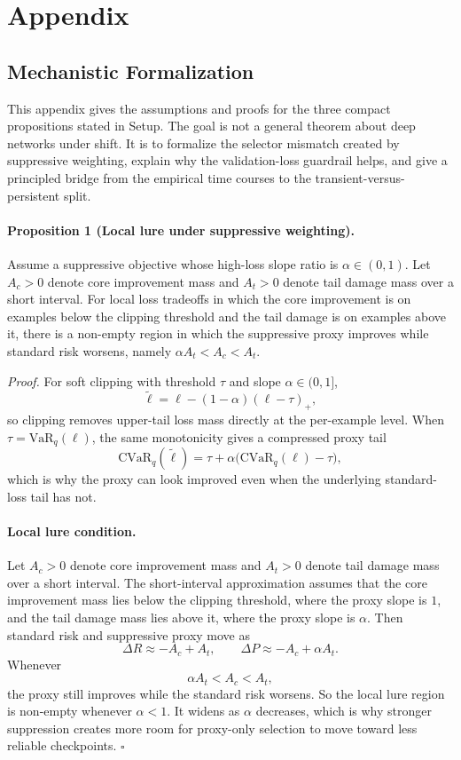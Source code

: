 \section{Appendix}
\label{app:extra}

\subsection{Mechanistic Formalization}
\label{app:theory-bridge}
This appendix gives the assumptions and proofs for the three compact propositions stated in Setup.
The goal is not a general theorem about deep networks under shift.
It is to formalize the selector mismatch created by suppressive weighting, explain why the validation-loss guardrail helps, and give a principled bridge from the empirical time courses to the transient-versus-persistent split.

\paragraph{Proposition 1 (Local lure under suppressive weighting).}
Assume a suppressive objective whose high-loss slope ratio is $\alpha \in (0,1)$.
Let $A_c>0$ denote core improvement mass and $A_t>0$ denote tail damage mass over a short interval.
For local loss tradeoffs in which the core improvement is on examples below the clipping threshold and the tail damage is on examples above it, there is a non-empty region in which the suppressive proxy improves while standard risk worsens, namely $\alpha A_t < A_c < A_t$.

\emph{Proof.}
For soft clipping with threshold $\tau$ and slope $\alpha \in (0,1]$,
\[
\tilde{\ell} = \ell - (1-\alpha)(\ell-\tau)_+,
\]
so clipping removes upper-tail loss mass directly at the per-example level.
When $\tau=\mathrm{VaR}_q(\ell)$, the same monotonicity gives a compressed proxy tail
\[
\mathrm{CVaR}_q(\tilde{\ell}) = \tau + \alpha\big(\mathrm{CVaR}_q(\ell)-\tau\big),
\]
which is why the proxy can look improved even when the underlying standard-loss tail has not.

\paragraph{Local lure condition.}
Let $A_c>0$ denote core improvement mass and $A_t>0$ denote tail damage mass over a short interval.
The short-interval approximation assumes that the core improvement mass lies below the clipping threshold, where the proxy slope is $1$, and the tail damage mass lies above it, where the proxy slope is $\alpha$.
Then standard risk and suppressive proxy move as
\[
\Delta R \approx -A_c + A_t,
\qquad
\Delta P \approx -A_c + \alpha A_t.
\]
Whenever
\[
\alpha A_t < A_c < A_t,
\]
the proxy still improves while the standard risk worsens.
So the local lure region is non-empty whenever $\alpha<1$.
It widens as $\alpha$ decreases, which is why stronger suppression creates more room for proxy-only selection to move toward less reliable checkpoints.
\hfill$\square$

